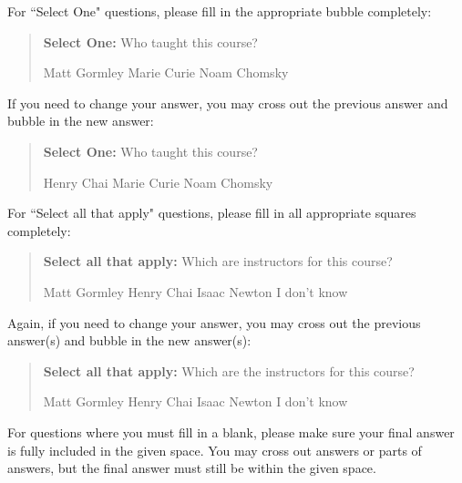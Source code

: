 \documentclass[11pt,addpoints,answers]{exam}
\newcommand{\blackcircle}{\tikz\draw[black,fill=black] (0,0) circle (1ex);}
\begin{document}
For ``Select One" questions, please fill in the appropriate bubble completely:

\begin{quote}
\textbf{Select One:} Who taught this course?
    \begin{checkboxes}
     \CorrectChoice Matt Gormley
     \choice Marie Curie
     \choice Noam Chomsky
    \end{checkboxes}
\end{quote}

If you need to change your answer, you may cross out the previous answer and bubble in the new answer:

\begin{quote}
\textbf{Select One:} Who taught this course?
    {
    \begin{checkboxes}
     \CorrectChoice Henry Chai
     \choice Marie Curie \checkboxchar{\xcancel{\blackcircle}{}}
     \choice Noam Chomsky
    \end{checkboxes}
    }
\end{quote}

For ``Select all that apply" questions, please fill in all appropriate squares completely:

\begin{quote}
\textbf{Select all that apply:} Which are instructors for this course?
    {%
    \checkboxchar{$\Box$} \checkedchar{$\blacksquare$} %
    \begin{checkboxes}
    \CorrectChoice Matt Gormley  
    \CorrectChoice Henry Chai
    \choice Isaac Newton
    \choice I don't know
    \end{checkboxes}
    }
\end{quote}

Again, if you need to change your answer, you may cross out the previous answer(s) and bubble in the new answer(s):

\begin{quote}
\textbf{Select all that apply:} Which are the instructors for this course?
    {%
    \checkboxchar{\xcancel{$\blacksquare$}} \checkedchar{$\blacksquare$} %
    \begin{checkboxes}
    \CorrectChoice Matt Gormley 
    \CorrectChoice Henry Chai
    \choice Isaac Newton
    \choice I don't know
    \end{checkboxes}
    }
\end{quote}

For questions where you must fill in a blank, please make sure your final answer is fully included in the given space. You may cross out answers or parts of answers, but the final answer must still be within the given space.
\end{document}
